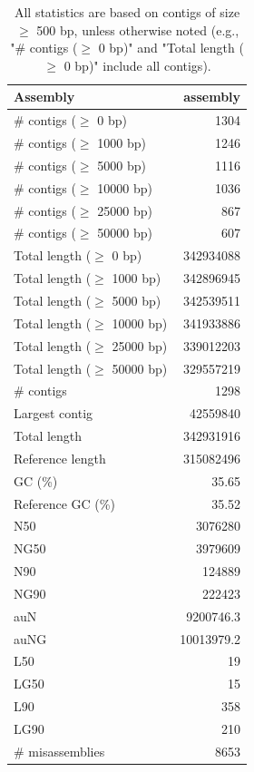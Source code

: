 \documentclass[12pt,a4paper]{article}
\begin{document}
\begin{table}[ht]
\begin{center}
\caption{All statistics are based on contigs of size $\geq$ 500 bp, unless otherwise noted (e.g., "\# contigs ($\geq$ 0 bp)" and "Total length ($\geq$ 0 bp)" include all contigs).}
\begin{tabular}{|l*{1}{|r}|}
\hline
Assembly & assembly \\ \hline
\# contigs ($\geq$ 0 bp) & 1304 \\ \hline
\# contigs ($\geq$ 1000 bp) & 1246 \\ \hline
\# contigs ($\geq$ 5000 bp) & 1116 \\ \hline
\# contigs ($\geq$ 10000 bp) & 1036 \\ \hline
\# contigs ($\geq$ 25000 bp) & 867 \\ \hline
\# contigs ($\geq$ 50000 bp) & 607 \\ \hline
Total length ($\geq$ 0 bp) & 342934088 \\ \hline
Total length ($\geq$ 1000 bp) & 342896945 \\ \hline
Total length ($\geq$ 5000 bp) & 342539511 \\ \hline
Total length ($\geq$ 10000 bp) & 341933886 \\ \hline
Total length ($\geq$ 25000 bp) & 339012203 \\ \hline
Total length ($\geq$ 50000 bp) & 329557219 \\ \hline
\# contigs & 1298 \\ \hline
Largest contig & 42559840 \\ \hline
Total length & 342931916 \\ \hline
Reference length & 315082496 \\ \hline
GC (\%) & 35.65 \\ \hline
Reference GC (\%) & 35.52 \\ \hline
N50 & 3076280 \\ \hline
NG50 & 3979609 \\ \hline
N90 & 124889 \\ \hline
NG90 & 222423 \\ \hline
auN & 9200746.3 \\ \hline
auNG & 10013979.2 \\ \hline
L50 & 19 \\ \hline
LG50 & 15 \\ \hline
L90 & 358 \\ \hline
LG90 & 210 \\ \hline
\# misassemblies & 8653 \\ \hline

\end{tabular}
\end{center}
\end{table}
\end{document}
